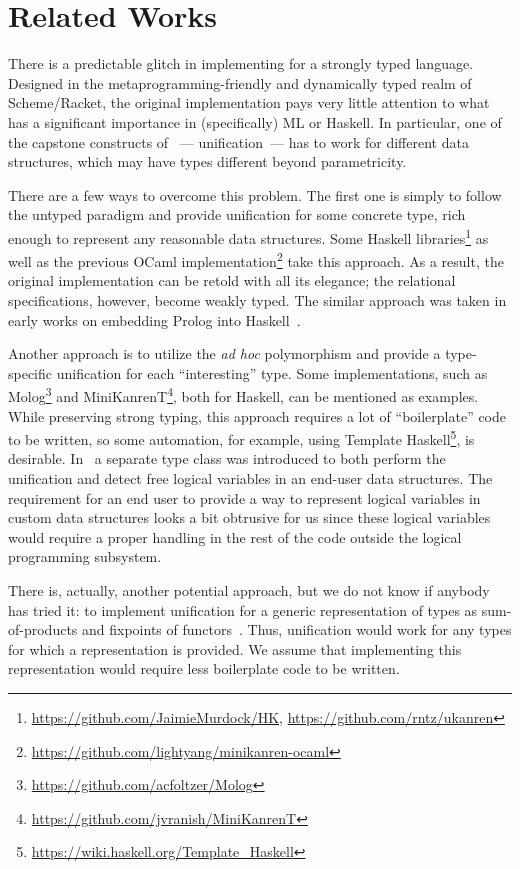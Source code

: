 \section{Related Works}
\label{sec:relworks}

There is a predictable glitch in implementing \miniKanren for a strongly typed language.
Designed in the metaprogramming-friendly and dynamically typed realm of Scheme/Racket, the original
\miniKanren implementation pays very little attention to what has a significant importance in (specifically)
ML or Haskell. In particular, one of the capstone constructs of \miniKanren~--- unification~--- has to work for
different data structures, which may have types different beyond parametricity.

There are a few ways to overcome this problem. The first one is simply to follow the untyped paradigm and
provide unification for some concrete type, rich enough to represent any reasonable data structures.
Some Haskell \miniKanren libraries\footnote{\url{https://github.com/JaimieMurdock/HK}, \url{https://github.com/rntz/ukanren}}
as well as the previous OCaml implementation\footnote{\url{https://github.com/lightyang/minikanren-ocaml}} take this approach.
As a result, the original implementation can be retold with all its elegance; the relational specifications, however,
become weakly typed. The similar approach was taken in early works on embedding Prolog into Haskell~\cite{PrologInHaskell}.

Another approach is to utilize the \emph{ad hoc} polymorphism and provide a type-specific unification for each ``interesting'' type.
Some \miniKanren implementations, such as Molog\footnote{\url{https://github.com/acfoltzer/Molog}} and
MiniKanrenT\footnote{\url{https://github.com/jvranish/MiniKanrenT}}, both for Haskell, can be mentioned as examples.
While preserving strong typing, this approach requires a lot of ``boilerplate''
code to be written, so some automation, for example, using Template Haskell\footnote{\url{https://wiki.haskell.org/Template_Haskell}},
is desirable. In~\cite{TypedLogicalVariables} a separate type class was introduced to both perform the unification
and detect free logical variables in an end-user data structures. The requirement for an end user to provide a way to represent
logical variables in custom data structures looks a bit obtrusive for us since these logical variables would require a proper
handling in the rest of the code outside the logical programming subsystem.

There is, actually, another potential approach, but we do not know if anybody has tried
it: to implement unification for a generic representation of types as sum-of-products and fixpoints of
functors~\cite{InstantGenerics, ALaCarte}. Thus, unification would work for any types for which a representation
is provided. We assume that implementing this representation would require less boilerplate code to be written.

